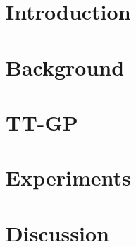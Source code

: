 \documentclass[twoside]{article}
\begin{document}
\section{Introduction}
  

\section {Background}
  

\section{TT-GP}
  

\section{Experiments}
  

\section{Discussion}
  




\end{document}
